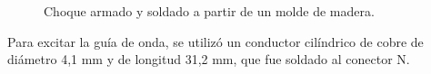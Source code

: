 \begin{figure} [H]
\centering 
{}
\hspace{5mm}
\caption{Choque armado y soldado a partir de un molde de madera.}
\label{grup_fig_resultados:2}
\end{figure}
Para excitar la guía de onda, se utilizó un conductor cilíndrico de cobre de diámetro 4,1 mm y de longitud 31,2 mm, que fue soldado al conector N.
